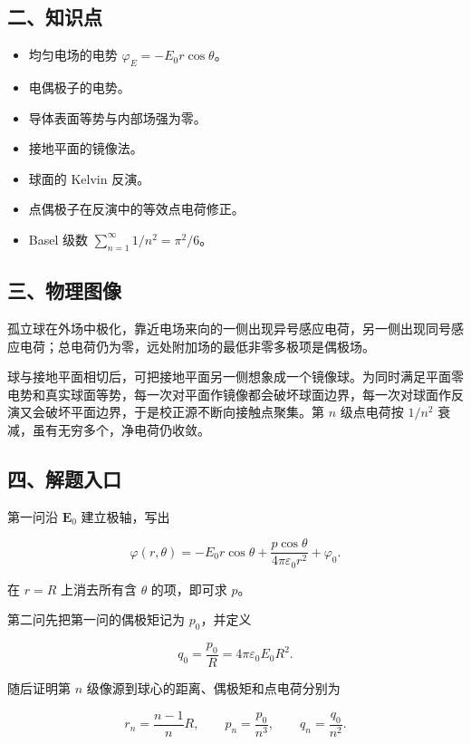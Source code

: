 \documentclass[12pt,a4paper,UTF8]{ctexart}
\newcommand{\tightlist}{\setlength{\itemsep}{0pt}\setlength{\parskip}{0pt}}
\begin{document}
\subsection{二、知识点}\label{ux4e8cux77e5ux8bc6ux70b9-3}

\begin{itemize}
\tightlist
\item
  均匀电场的电势 \(\varphi_E=-E_0r\cos\theta\)。
\item
  电偶极子的电势。
\item
  导体表面等势与内部场强为零。
\item
  接地平面的镜像法。
\item
  球面的 Kelvin 反演。
\item
  点偶极子在反演中的等效点电荷修正。
\item
  Basel 级数 \(\sum_{n=1}^{\infty}1/n^2=\pi^2/6\)。
\end{itemize}

\subsection{三、物理图像}\label{ux4e09ux7269ux7406ux56feux50cf-3}

孤立球在外场中极化，靠近电场来向的一侧出现异号感应电荷，另一侧出现同号感应电荷；总电荷仍为零，远处附加场的最低非零多极项是偶极场。

球与接地平面相切后，可把接地平面另一侧想象成一个镜像球。为同时满足平面零电势和真实球面等势，每一次对平面作镜像都会破坏球面边界，每一次对球面作反演又会破坏平面边界，于是校正源不断向接触点聚集。第
\(n\) 级点电荷按 \(1/n^2\) 衰减，虽有无穷多个，净电荷仍收敛。

\subsection{四、解题入口}\label{ux56dbux89e3ux9898ux5165ux53e3-3}

第一问沿 \(\bm E_0\) 建立极轴，写出

\[\varphi(r,\theta)
=-E_0r\cos\theta
+\frac{p\cos\theta}{4\pi\varepsilon_0r^2}
+\varphi_0.\]

在 \(r=R\) 上消去所有含 \(\theta\) 的项，即可求 \(p\)。

第二问先把第一问的偶极矩记为 \(p_0\)，并定义

\[q_0=\frac{p_0}{R}=4\pi\varepsilon_0E_0R^2.\]

随后证明第 \(n\) 级像源到球心的距离、偶极矩和点电荷分别为

\[r_n=\frac{n-1}{n}R,\qquad
p_n=\frac{p_0}{n^3},\qquad
q_n=\frac{q_0}{n^2}.\]
\end{document}
